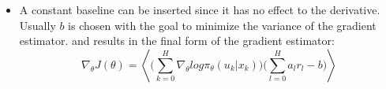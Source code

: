 {\begin{pcolumn}
{\begin{itemize}
\begin{equation}
	\nabla_\theta log p_\theta (\tau) = \sum_{k=0}^H \nabla_\theta log \pi_\theta (u_k | x_k)
\end{equation}
	\item A constant baseline can be inserted since it has no effect to the derivative. Usually $b$ is chosen with the goal to minimize the variance of the gradient estimator. and results in the final form of the gradient estimator:
\begin{equation}
	\nabla_\theta J(\theta) = \left<\bigg(\sum_{k=0}^H \nabla_\theta log \pi_\theta (u_k | x_k)\bigg)\bigg(\sum_{l=0}^Ha_l r_l - b\bigg)\right>
\end{equation}

\end{itemize}
\vspace*{2mm}
}


\end{pcolumn}
%
\hfill
\begin{pcolumn}





\end{pcolumn}}
